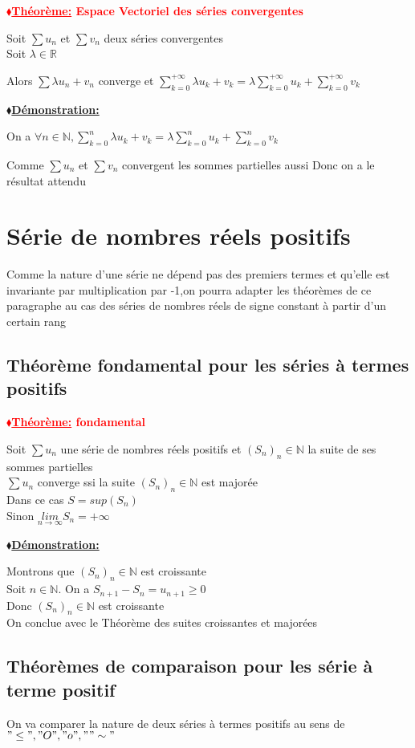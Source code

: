 \documentclass[12pt]{report}
\newcommand{\rd}[1]{\textcolor{red}{#1}}
\newcommand{\blz}{$\blacklozenge$}
\newcommand{\ns}{\\\indent\indent\vspace{0.25cm}}
\newcommand{\props}[1]
{
\begin{mybox}
\textbf{\rd{\underline{\blz Théorème:} #1}}
\vspace{0.5cm}
\newline
}
\newcommand{\prope}
{
\end{mybox}
}
\newcommand{\demos}[1]
{
\begin{demo}
\textbf{\underline{\blz Démonstration:} #1}
\newline
}
\newcommand{\demoe}
{
\end{demo}
}
\newcommand{\R}{\mathbb{R}}
\newcommand{\N}{\mathbb{N}}
\newcommand{\nint}[1]{#1 \in \N}
\newcommand{\limi}[1]{\underset{#1 \to \infty}{lim}}
\newcommand{\un}[1]{u_{#1}}
\newcommand{\Sn}[1]{S_{#1}}
\newcommand{\Sns}{(S_n)_\nint{n}}
\newcommand{\seriegu}{\sum u_n}
\newcommand{\seriegv}{\sum v_n}
\newcommand{\serie}[3]{\sum_{#1}^{#2}{#3}}
\newcommand{\satps}{série à terme positif}
\begin{document}
\props{Espace Vectoriel des séries convergentes}
Soit $\seriegu$ et $\seriegv$ deux séries convergentes\\
Soit $\lambda \in \R$

Alors $\sum \lambda u_n +v_n$ converge et $\serie{k=0}{+\infty}{\lambda u_k+ v_k} = \lambda \serie{k=0}{+\infty}{u_k} + \serie{k=0}{+\infty}{v_k}$
\prope

\demos{}
On a $\forall \nint{n} ,\serie{k=0}{n}{\lambda u_k+ v_k} = \lambda \serie{k=0}{n}{u_k} + \serie{k=0}{n}{v_k}$\ns

Comme $\seriegu$ et $\seriegv$ convergent les sommes partielles aussi
Donc on a le résultat attendu
\demoe

\section{Série de nombres réels positifs}

Comme la nature d'une série ne dépend pas des premiers termes et qu'elle est invariante par multiplication par -1,on pourra adapter les théorèmes de ce paragraphe au cas des séries de nombres réels de signe constant à partir d'un certain rang

\subsection{Théorème fondamental pour les séries à termes positifs}

\props{fondamental}
Soit $\seriegu$ une série de nombres réels positifs et $\Sns$ la suite de ses sommes partielles\\
$\seriegu$ converge ssi la suite $\Sns$ est majorée\\
Dans ce cas $S= sup(S_n)$ \ns Sinon $\limi{n} S_n = +\infty$
\prope

\demos{}
Montrons que $\Sns$ est croissante\\
Soit $\nint{n}$. On a $\Sn{n+1} - \Sn{n} = \un{n+1} \geq 0$ \\
Donc $\Sns$ est croissante\\
On conclue avec le Théorème des suites croissantes et majorées
\demoe

\subsection{Théorèmes de comparaison pour les \satps}

On va comparer la nature de deux séries à termes positifs au sens de $ "\leq","O","o",""\sim"$
\end{document}
